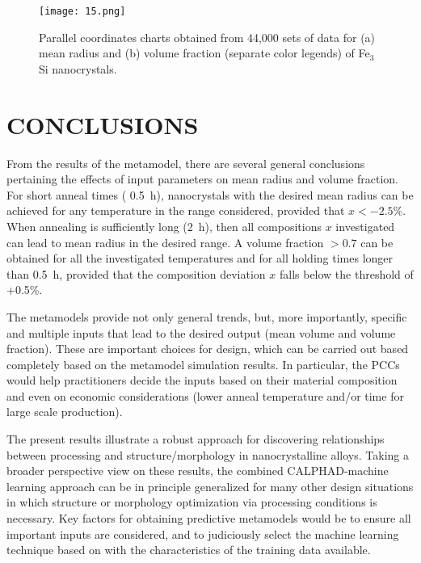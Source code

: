 \begin{figure*}[ht]
\centering
\texttt{[image: 15.png]}
\caption{Parallel coordinates charts obtained from 44,000 sets of data
for (a) mean radius and  (b) volume fraction (separate color legends) of Fe$_3$Si nanocrystals.\cite{CITRINE}} \label{output_m_rad_vol_fr}
\end{figure*}



\section{CONCLUSIONS}\label{conclusions}

From the results of the metamodel, there are several general
conclusions pertaining the effects of input parameters on
mean radius and volume fraction. For short anneal times ( 0.5~h), nanocrystals with the desired mean radius
 can be achieved for any temperature in the range considered, provided that $x<-2.5$\%. When annealing is sufficiently long (2~h),
then all compositions $x$ investigated can lead to mean radius in the desired range.
A volume fraction $>0.7$ can be obtained for all the investigated temperatures and for all holding
times longer than 0.5~h, provided that the composition deviation $x$ falls below the threshold of +0.5\%.

The metamodels provide not only general trends, but, more importantly, specific and multiple inputs
that lead to the desired output (mean volume and volume fraction).
These are important choices for design, which
can be carried out based completely based on the metamodel simulation results.
In particular,  the PCCs would help practitioners decide the inputs
based on their material composition  and even on economic
considerations (lower anneal temperature and/or time for large scale production).

The present results illustrate a robust approach for discovering relationships between
processing and structure/morphology in nanocrystalline alloys.
Taking a broader perspective view on these results, the combined CALPHAD-machine learning approach can be
in principle generalized for many other design situations in which structure or morphology optimization
via processing conditions is necessary.
Key factors for obtaining predictive metamodels would be to ensure all important inputs are considered, and to
judiciously select the machine
learning technique based on with the characteristics of the training data available.




